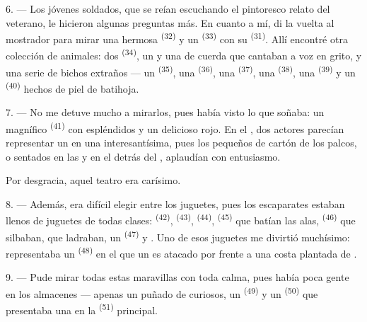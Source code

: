 6. --- Los jóvenes soldados, que se reían escuchando el pintoresco relato
del veterano, le hicieron algunas preguntas más. En cuanto a mí, di la
vuelta al mostrador para mirar una hermosa  \textsuperscript{(32)} y
un  \textsuperscript{(33)} con su  \textsuperscript{(31)}. Allí
encontré otra colección de animales: dos 
\textsuperscript{(34)}, un  y una  de cuerda que
cantaban a voz en grito, y una serie de bichos extraños --- un
 \textsuperscript{(35)}, una  \textsuperscript{(36)}, una
 \textsuperscript{(37)}, una  \textsuperscript{(38)}, una
 \textsuperscript{(39)} y un  \textsuperscript{(40)} hechos de
piel de batihoja.

7. --- No me detuve mucho a mirarlos, pues había visto lo que soñaba: un
magnífico  \textsuperscript{(41)} con espléndidos
 y un delicioso  rojo. En el
, dos actores parecían representar un  en
una  interesantísima, pues los pequeños 
de cartón de los palcos, o sentados en las  y en el
 detrás del , aplaudían con
entusiasmo.

Por desgracia, aquel teatro era carísimo.

8. --- Además, era difícil elegir entre los juguetes, pues los escaparates
estaban llenos de juguetes de todas clases: 
\textsuperscript{(42)},  \textsuperscript{(43)}, 
\textsuperscript{(44)},  \textsuperscript{(45)} que batían las alas,
 \textsuperscript{(46)} que silbaban,  que
ladraban, un  \textsuperscript{(47)} y . Uno de
esos juguetes me divirtió muchísimo: representaba un
 \textsuperscript{(48)} en el que un  es atacado
por  frente a una costa plantada de .


9. --- Pude mirar todas estas maravillas con toda calma, pues había poca
gente en los almacenes --- apenas un puñado de curiosos, un
 \textsuperscript{(49)} y un  \textsuperscript{(50)} que
presentaba una  en la  \textsuperscript{(51)}
principal.

